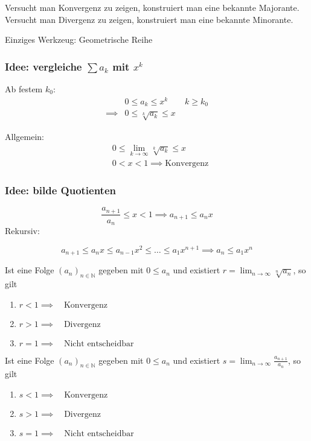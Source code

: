 Versucht man Konvergenz zu zeigen, konstruiert man eine bekannte Majorante.\newline
Versucht man Divergenz zu zeigen, konstruiert man eine bekannte Minorante. \newline

\noindent Einziges Werkzeug: Geometrische Reihe

\subsubsection*{Idee: vergleiche $ \sum a_k $ mit $x^k$}
Ab festem \( k_0 \):
\begin{align*}
	&0 \leq a_k \leq x^k \qquad k \geq k_0 \\
	\implies &0 \leq \sqrt[k]{a_k} \leq x
\end{align*}

\noindent Allgemein:
\begin{align*}
	&0 \leq \lim_{k\rightarrow\infty} \sqrt[k]{a_k} \leq x \\
	&0 < x < 1 \implies \text{Konvergenz}
\end{align*}

\subsubsection*{Idee: bilde Quotienten} %
\label{sub:bilde_quotienten}

\[
	\frac{a_{n+1}}{a_n} \leq x < 1 \implies a_{n+1} \leq a_n x
\]
Rekursiv:

\[
	a_{n+1} \leq a_nx \leq a_{n-1}x^2\leq \ldots \leq a_1x^{n+1} \implies a_n \leq a_1x^n
\]

\begin{theorem}[Wurzelkriterium]
		Ist eine Folge \( (a_n)_{n \in \mathbb{N}} \) gegeben mit \( 0 \leq a_n \) und existiert \( r = \lim_{n\rightarrow\infty} \sqrt[n]{a_n} \), so gilt
		\begin{enumerate}
			\item \( r < 1 \implies \quad \text{Konvergenz} \)
			\item \( r > 1 \implies \quad \text{Divergenz} \)
			\item \( r = 1 \implies \quad \text{Nicht entscheidbar} \)
		\end{enumerate}
\end{theorem}

\begin{theorem}[Quotientenkriterium]
	Ist eine Folge \( (a_n)_{n \in \mathbb{N} } \) gegeben mit \( 0 \leq a_n \) und existiert \( s = \lim_{n\rightarrow\infty} \frac{a_{n+1}}{a_n} \), so gilt
	\begin{enumerate}
		\item \( s < 1 \implies \quad \text{Konvergenz} \)
		\item \( s > 1 \implies \quad \text{Divergenz} \)
		\item \( s = 1 \implies \quad \text{Nicht entscheidbar} \)
	\end{enumerate}
\end{theorem}

